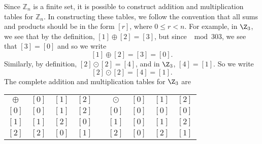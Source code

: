 Since  $\mathbb{Z}_n$ is a finite set, it is possible to construct addition and multiplication tables for $\mathbb{Z}_n$.    In constructing these tables, we follow the convention that all sums and products should be in the form $[ r]$, where 
$0 \leq r < n$.  For example, in $\Z_3$, we see that by the definition, $[1] \oplus [2] = [3]$, but since $\mod{3}{0}{3}$, we see that $[3] = [0]$ and so we write 
\[
[1] \oplus [2] = [3] = [0].
\]
Similarly, by definition, $[2] \odot [2] = [4]$, and in $\Z_3$, $[4] = [1]$.  So we write
\[
[2] \odot [2] = [4] = [1].
\]
The complete addition and multiplication tables for $\Z_3$ are
\begin{center}
\begin{tabular}{ c | c  c  c p{0.5in} c | c  c  c}
$\oplus$ & $[ 0 ]$ & $[ 1 ]$ & $[2]$ & & $\odot$ & $[ 0 ]$ & $[ 1 ]$ & $[2]$  \\ \cline{1-4} \cline{6-9}

$[ 0 ]$ & $[ 0 ]$ & $[ 1 ]$ & $[2]$ &  & $[ 0 ]$ & $[ 0 ]$ & $[ 0 ]$ & $[0]$  \\ 

$[ 1 ]$ & $[ 1 ]$ & $[ 2 ]$ & $[0]$ & & $[ 1 ]$ & $[ 0 ]$ & $[ 1 ]$ & $[2]$ \\

$[ 2 ]$ & $[ 2 ]$ & $[ 0 ]$ & $[1]$ & & $[ 2 ]$ & $[ 0 ]$ & $[ 2 ]$ & $[1]$ \\

\end{tabular}
\end{center}

%
%

